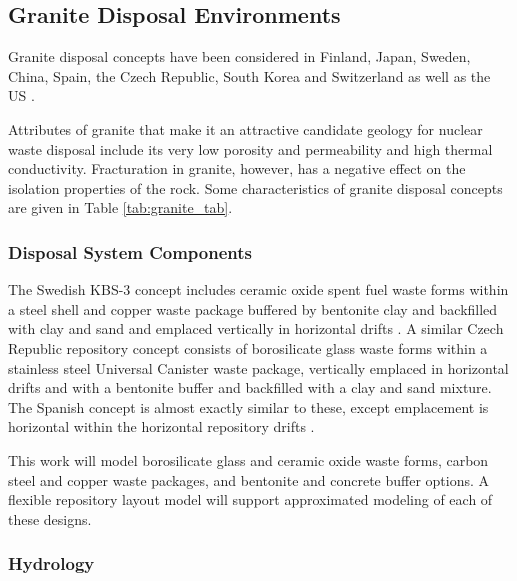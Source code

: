 
\subsection{Granite Disposal Environments}

Granite disposal concepts have been considered in Finland, Japan, Sweden, China,  
Spain, the Czech Republic, South Korea and Switzerland as well as the \gls{US} 
\cite{hardin_generic_2011, andra_granite:_2005, von_lensa_red-impact_2008}. 

Attributes of granite that make it an attractive candidate geology for nuclear 
waste disposal include its very low porosity and permeability and high thermal 
conductivity. Fracturation in granite, however, has a negative effect on the 
isolation properties of the rock.
Some characteristics of granite disposal 
concepts are given in Table \ref{tab:granite_tab}.   



\subsubsection{Disposal System Components}

The Swedish KBS-3 concept includes ceramic oxide spent fuel waste forms within a 
steel shell and copper waste package buffered by bentonite clay and backfilled 
with clay and sand and emplaced vertically in horizontal drifts 
\cite{ab_long-term_2006}.
A similar Czech Republic repository concept consists of 
borosilicate glass waste forms within a stainless steel Universal Canister waste 
package, vertically emplaced in horizontal drifts and with a bentonite buffer  
and backfilled with a clay and sand mixture.
The Spanish concept is almost exactly similar to 
these, except emplacement is horizontal within the horizontal repository drifts
\cite{ von_lensa_red-impact_2008}.



This work  will model borosilicate glass and ceramic oxide waste forms, 
carbon steel and copper waste packages, and bentonite and concrete buffer 
options.  A flexible repository layout model will support approximated modeling
of each of these designs.


\subsubsection{Hydrology}

